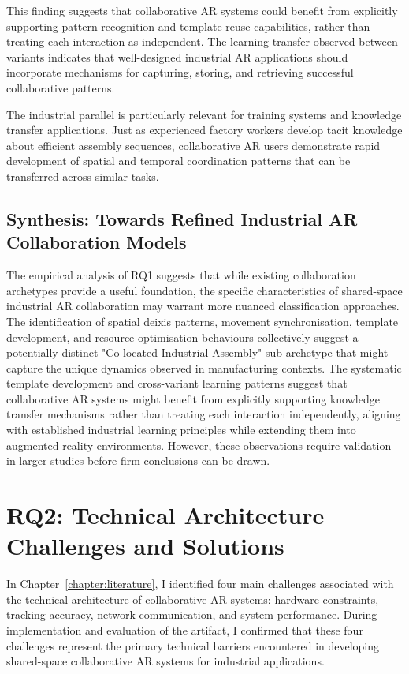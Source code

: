 This finding suggests that collaborative AR systems could benefit from explicitly supporting pattern recognition and template reuse capabilities, rather than treating each interaction as independent. The learning transfer observed between variants indicates that well-designed industrial AR applications should incorporate mechanisms for capturing, storing, and retrieving successful collaborative patterns.

The industrial parallel is particularly relevant for training systems and knowledge transfer applications. Just as experienced factory workers develop tacit knowledge about efficient assembly sequences, collaborative AR users demonstrate rapid development of spatial and temporal coordination patterns that can be transferred across similar tasks.

\subsection{Synthesis: Towards Refined Industrial AR Collaboration Models}
The empirical analysis of RQ1 suggests that while existing collaboration archetypes provide a useful foundation, the specific characteristics of shared-space industrial AR collaboration may warrant more nuanced classification approaches. The identification of spatial deixis patterns, movement synchronisation, template development, and resource optimisation behaviours collectively suggest a potentially distinct "Co-located Industrial Assembly" sub-archetype that might capture the unique dynamics observed in manufacturing contexts. The systematic template development and cross-variant learning patterns suggest that collaborative AR systems might benefit from explicitly supporting knowledge transfer mechanisms rather than treating each interaction independently, aligning with established industrial learning principles while extending them into augmented reality environments. However, these observations require validation in larger studies before firm conclusions can be drawn.

\section{RQ2: Technical Architecture Challenges and Solutions}
In Chapter~\ref{chapter:literature}, I identified four main challenges associated with the technical architecture of collaborative AR systems: hardware constraints, tracking accuracy, network communication, and system performance. During implementation and evaluation of the artifact, I confirmed that these four challenges represent the primary technical barriers encountered in developing shared-space collaborative AR systems for industrial applications.

